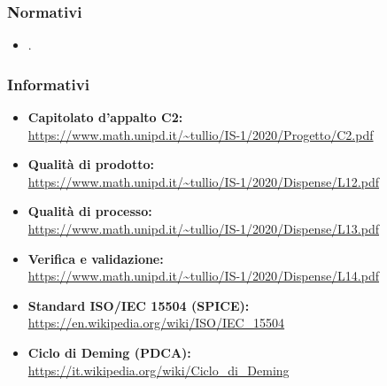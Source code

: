 \subsubsection{Normativi}
\begin{itemize}
	\item {}.
\end{itemize}
\subsubsection{Informativi} \label{riferimenti_info}
\begin{itemize}
	\item \textbf{Capitolato d'appalto C2:}\\
	\url{https://www.math.unipd.it/~tullio/IS-1/2020/Progetto/C2.pdf}
	\item \textbf{Qualità di prodotto:}\\ \url{https://www.math.unipd.it/~tullio/IS-1/2020/Dispense/L12.pdf}
	\item \textbf{Qualità di processo:}\\ \url{https://www.math.unipd.it/~tullio/IS-1/2020/Dispense/L13.pdf}
	\item \textbf{Verifica e validazione:}\\ \url{https://www.math.unipd.it/~tullio/IS-1/2020/Dispense/L14.pdf}
	\item \textbf{Standard ISO/IEC 15504 (SPICE):}\\ \url{https://en.wikipedia.org/wiki/ISO/IEC_15504}
	\item \textbf{Ciclo di Deming (PDCA):} \\ \url{https://it.wikipedia.org/wiki/Ciclo_di_Deming}
\end{itemize}